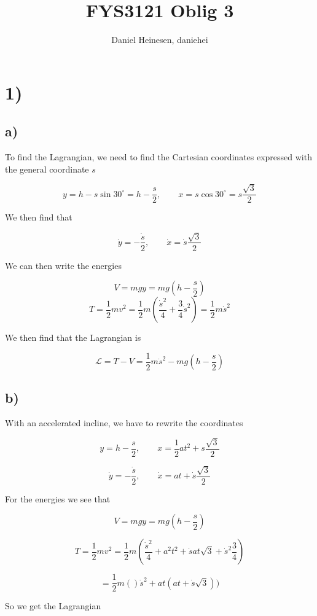 \documentclass[a4paper,norsk, 10pt]{article}
\title{FYS3121 Oblig 3}
\author{Daniel Heinesen, daniehei}
\begin{document}
\maketitle

\section*{1)}
\subsection*{a)}

To find the Lagrangian, we need to find the Cartesian coordinates expressed with the general coordinate $s$

\begin{equation}
y = h -s\sin 30^{\circ} = h-\frac{s}{2}, \qquad x = s\cos 30^{\circ} = s\frac{\sqrt{3}}{2}
\end{equation}

We then find that

$$
\dot{y} = -\frac{\dot{s}}{2}, \qquad \dot{x} = \dot{s}\frac{\sqrt{3}}{2}
$$

We can then write the energies

$$
V = mgy = mg(h-\frac{s}{2})
$$
$$
T = \frac{1}{2}mv^2 = \frac{1}{2}m(\frac{\dot{s}^2}{4} + \frac{3}{4}\dot{s}^2) = \frac{1}{2}m\dot{s}^2
$$

We then find that the Lagrangian is

$$
\mathcal{L} = T -V = \frac{1}{2}m\dot{s}^2 -mg(h-\frac{s}{2}) 
$$

\subsection*{b)}
With an accelerated incline, we have to rewrite the coordinates

$$
y = h-\frac{s}{2}, \qquad x = \frac{1}{2}at^2 + s\frac{\sqrt{3}}{2}
$$

$$
\dot{y} = -\frac{\dot{s}}{2}, \qquad \dot{x} = at + \dot{s}\frac{\sqrt{3}}{2}
$$

For the energies we see that

$$
V = mgy = mg(h-\frac{s}{2})
$$

$$
T = \frac{1}{2}mv^2 = \frac{1}{2}m(\frac{\dot{s}^2}{4} + a^2t^2 + \dot{s}at\sqrt{3} + \dot{s}^2\frac{3}{4})
$$

$$
= \frac{1}{2}m()\dot{s}^2 + at(at + \dot{s}\sqrt{3}))
$$

So we get the Lagrangian 
\end{document}
